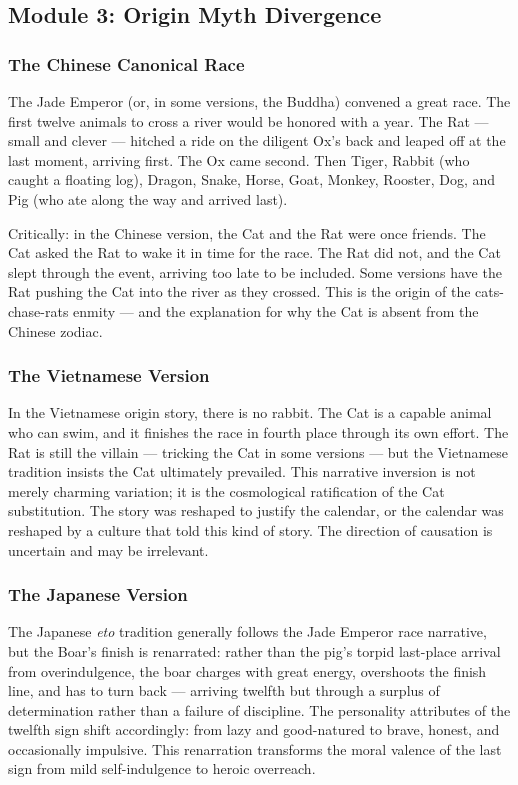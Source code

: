 \documentclass[11pt,letterpaper]{article}
\begin{document}
\subsection{Module 3: Origin Myth Divergence}

\subsubsection{The Chinese Canonical Race}

The Jade Emperor (or, in some versions, the Buddha) convened a great race. The first twelve animals to cross a river would be honored with a year. The Rat --- small and clever --- hitched a ride on the diligent Ox's back and leaped off at the last moment, arriving first. The Ox came second. Then Tiger, Rabbit (who caught a floating log), Dragon, Snake, Horse, Goat, Monkey, Rooster, Dog, and Pig (who ate along the way and arrived last).

Critically: in the Chinese version, the Cat and the Rat were once friends. The Cat asked the Rat to wake it in time for the race. The Rat did not, and the Cat slept through the event, arriving too late to be included. Some versions have the Rat pushing the Cat into the river as they crossed. This is the origin of the cats-chase-rats enmity --- and the explanation for why the Cat is absent from the Chinese zodiac.

\subsubsection{The Vietnamese Version}

In the Vietnamese origin story, there is no rabbit. The Cat is a capable animal who can swim, and it finishes the race in fourth place through its own effort. The Rat is still the villain --- tricking the Cat in some versions --- but the Vietnamese tradition insists the Cat ultimately prevailed. This narrative inversion is not merely charming variation; it is the cosmological ratification of the Cat substitution. The story was reshaped to justify the calendar, or the calendar was reshaped by a culture that told this kind of story. The direction of causation is uncertain and may be irrelevant.

\subsubsection{The Japanese Version}

The Japanese \textit{eto} tradition generally follows the Jade Emperor race narrative, but the Boar's finish is renarrated: rather than the pig's torpid last-place arrival from overindulgence, the boar charges with great energy, overshoots the finish line, and has to turn back --- arriving twelfth but through a surplus of determination rather than a failure of discipline. The personality attributes of the twelfth sign shift accordingly: from lazy and good-natured to brave, honest, and occasionally impulsive. This renarration transforms the moral valence of the last sign from mild self-indulgence to heroic overreach.
\end{document}
